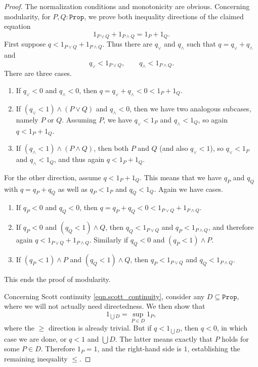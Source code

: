 \documentclass[reqno,11pt]{amsproc}
\theoremstyle{plain}
\theoremstyle{definition}
\newcommand{\Const}[1]{\mathtt{#1}}
\newcommand{\ind}[1]{1_{#1}}			%
\newcommand{\prop}{\Const{Prop}}
\numberwithin{equation}{section}
\begin{document}
\begin{proof}
	The normalization conditions and monotonicity are obvious. Concerning modularity, for $P,Q : \prop$, we prove both inequality directions of the claimed equation
	\[
		\ind{P \lor Q} + \ind{P \land Q} = \ind P + \ind Q.
	\]
	First suppose $q < \ind{P \lor Q} + \ind{P \land Q}$. Thus there are $q_\lor$ and $q_\land$ such that $q = q_\lor + q_\land$ and
	\[
		q_\lor < \ind{P \lor Q}, \qquad q_\land < \ind{P \land Q}.
	\]
	There are three cases.
	\begin{enumerate}[label=(\arabic*)]
		\item If $q_\lor < 0$ and $q_\land < 0$, then $q = q_\lor + q_\land < 0 < \ind P + \ind Q$.
		\item If  $(q_\lor < 1) \land (P \lor Q)$ and $q_\land < 0$, then we have two analogous subcases, namely $P$ or $Q$. Assuming $P$, we have $q_\lor < \ind P$ and $q_\land < \ind Q$, so again $q < \ind P + \ind Q$.
		\item If $(q_\land < 1) \land (P \land Q)$, then both $P$ and $Q$ (and also $q_\lor < 1$), so $q_\lor < \ind P$ and $q_\land < \ind Q$, and thus again $q < \ind P + \ind Q$.
	\end{enumerate}
	For the other direction, assume $q < \ind{P} + \ind{Q}$. This means that we have $q_P$ and $q_Q$ with $q = q_P + q_Q$ as well as $q_P < \ind{P}$ and $q_Q < \ind{Q}$. Again we have cases.
	\begin{enumerate}[label=(\arabic*)]
		\item If $q_P < 0$ and $q_Q < 0$, then $q = q_P + q_Q < 0 < \ind{P \lor Q} + \ind{P \land Q}$.
		\item If $q_P < 0$ and $(q_Q < 1)\land Q$, then $q_Q < \ind{P\lor Q}$ and $q_P < \ind{P \land Q}$, and therefore again $q < \ind{P \lor Q} + \ind{P \land Q}$. Similarly if $q_Q < 0$ and $(q_P < 1) \land P$. 
		\item If $(q_P < 1) \land P$ and $(q_Q < 1) \land Q$, then $q_P < \ind{P \lor Q}$ and $q_Q < \ind{P \land Q}$.
	\end{enumerate}
	This ends the proof of modularity.	

	Concerning Scott continuity \eqref{eqn.scott_continuity}, consider any $D \subseteq \prop$, where we will not actually need directedness. We then show that
	\[
		\ind{\bigcup D} = \sup_{P \in D} \ind{P} ,
	\]
	where the $\ge$ direction is already trivial. But if $q < \ind{\bigcup D}$, then $q < 0$, in which case we are done, or $q < 1$ and $\bigcup D$. The latter means exactly that $P$ holds for some $P \in D$. Therefore $1_P = 1$, and the right-hand side is $1$, establishing the remaining inequality $\le$.
\end{proof}
\end{document}
